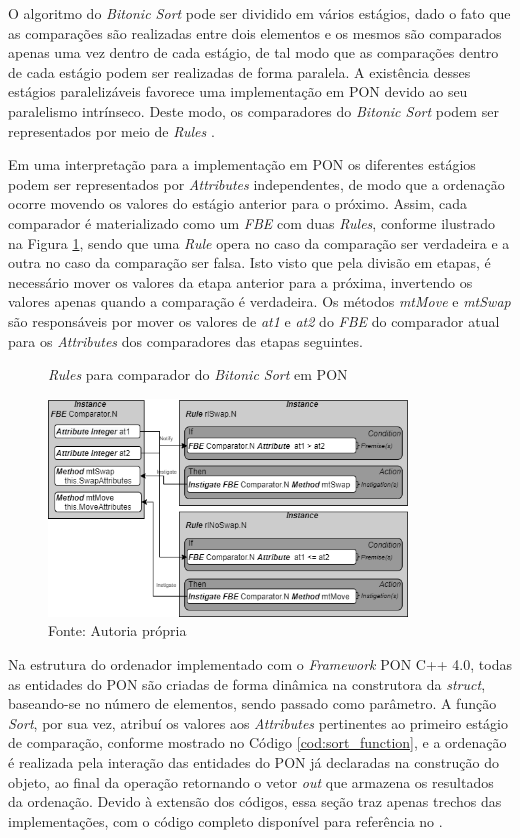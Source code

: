 O algoritmo do \textit{Bitonic Sort} pode ser dividido em vários estágios, dado
o fato que as comparações são realizadas entre dois elementos e os mesmos são
comparados apenas uma vez dentro de cada estágio, de tal modo que as comparações
dentro de cada estágio podem ser realizadas de forma paralela. A existência
desses estágios paralelizáveis favorece uma implementação em PON devido ao seu
paralelismo intrínseco. Deste modo, os comparadores do \textit{Bitonic Sort}
podem ser representados por meio de \textit{Rules}
\cite{quali_pordeus_2020,pordeus_2021}.

Em uma interpretação para a implementação em PON os diferentes estágios podem
ser representados por \textit{Attributes} independentes, de modo que a ordenação
ocorre movendo os valores do estágio anterior para o próximo. Assim, cada
comparador é materializado como um \textit{FBE} com duas \textit{Rules},
conforme ilustrado na Figura \ref{fig:rule_bitonic}, sendo que uma \textit{Rule}
opera no caso da comparação ser verdadeira e a outra no caso da comparação ser
falsa. Isto visto que pela divisão em etapas, é necessário mover os valores da
etapa anterior para a próxima, invertendo os valores apenas quando a comparação
é verdadeira. Os métodos \textit{mtMove} e \textit{mtSwap} são responsáveis por
mover os valores de \textit{at1} e \textit{at2} do \textit{FBE} do comparador
atual para os \textit{Attributes} dos comparadores das etapas seguintes.

\begin{figure}[!htb]
\centering
\caption{\textit{Rules} para comparador do \textit{Bitonic Sort} em PON}
\includegraphics[width=0.85\textwidth]{../figures/rule_bitonic.png}
\smallskip
\caption*{Fonte: Autoria própria}
\label{fig:rule_bitonic}
\end{figure}


Na estrutura do ordenador implementado com o \textit{Framework} PON C++ 4.0,
todas as entidades do PON são criadas de forma dinâmica na construtora da
\textit{struct}, baseando-se no número de elementos, sendo passado como
parâmetro. A função \textit{Sort}, por sua vez, atribuí os valores aos
\textit{Attributes} pertinentes ao primeiro estágio de comparação, conforme
mostrado no Código \ref{cod:sort_function}, e a ordenação é realizada pela
interação das entidades do PON já declaradas na construção do objeto, ao final
da operação retornando o vetor \textit{out} que armazena os resultados da
ordenação. Devido à extensão dos códigos, essa seção traz apenas trechos das implementações,
com o código completo disponível para referência no .

